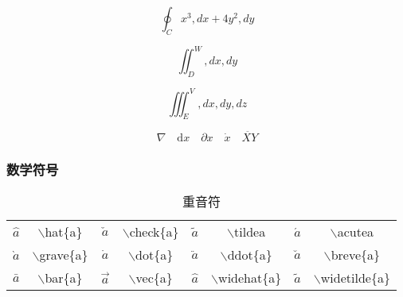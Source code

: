 \documentclass[UTF8]{ctexart}
\begin{document}
\[
\oint_{C} x^3, dx + 4y^2, dy
\]


\[
\iint_{D}^{W} , dx,dy
\]

\[
\iiint_{E}^{V} , dx,dy,dz
\]

\[
\nabla \quad \mathrm{d}x  \quad \partial x \quad \dot x \quad \ddot {XY}
\]


\subsubsection{数学符号}




\begin{table}[H]
	\begin{center}
		\caption{重音符}
		\begin{tabular}{cccccccc}

	
	$\hat{a}$ & $\backslash$hat\{a\} & $\check{a}$ & $\backslash$check\{a\}  &  $\tilde{a} $   &  $\backslash$tilde{a}  & $\acute{a}$  &  $\backslash$acute{a}   \\
	    
	 $\grave{a}$   &  $\backslash$grave\{a\}  &  $\dot{a}$  & $\backslash$dot\{a\}   &  $\ddot{a}$  &  $\backslash$ddot\{a\}  &  $\breve{a}$  &  $\backslash$breve\{a\} \\
	   
	 $\bar{a}$   &  $\backslash$bar\{a\}  &  $\vec{a}$  & $\backslash$vec\{a\}   &  $\widehat{a}$  &  $\backslash$widehat\{a\}  &  $\widetilde{a}$  &  $\backslash$widetilde\{a\} \\
	 
    \end{tabular}
\end{center}
\end{table}
\end{document}
